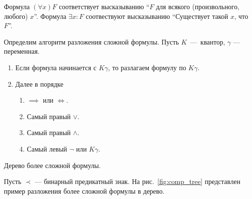 Формула $(\forall x)F$ соответствует высказыванию
``$F$ для всякого (произвольного, любого) $x$''.
Формула $\exists x:F$ соотвествуют высказыванию
``Существует такой $x$, что $F$''.

Определим алгоритм разложения сложной формулы.
Пусть $K$~---~квантор, $\gamma$ --- переменная.
\begin{enumerate}
  \item{}Если формула начинается с $K\gamma$, то разлагаем формулу по $K\gamma$.
  \item{}Далее в порядке
  \begin{multicols}{2}
    \begin{enumerate}
      \item{}$\implies$ или $\iff$.
      \item{}Самый правый $\lor$.
      \item{}Самый правый $\land$.
      \item{}Самый левый $\lnot$ или $K\gamma$.
    \end{enumerate}
  \end{multicols}
\end{enumerate}

\begin{marginfigure}

  \caption{Дерево более сложной формулы.}\label{fig:comp_tree}
\end{marginfigure}

Пусть $\prec$ --- бинарный предикатный знак.
На рис.~\ref{fig:comp_tree} представлен пример разложения более
сложной формулы в дерево.

